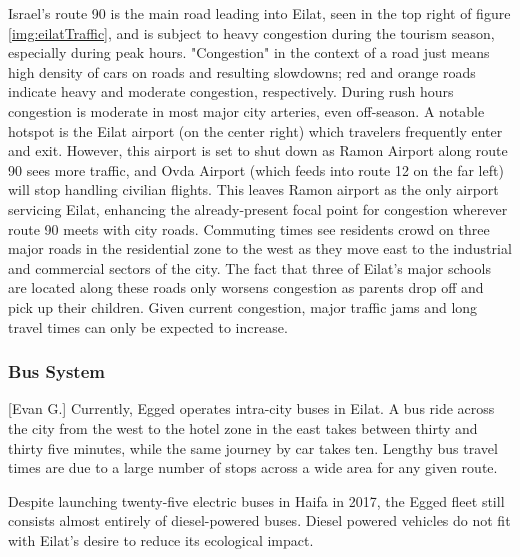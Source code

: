 \documentclass[12pt]{article}                               %
\begin{document}
Israel's route 90 is the main road leading into Eilat, seen in the top right of figure \ref{img:eilatTraffic}, and is subject to heavy congestion during the tourism season, especially during peak hours. "Congestion" in the context of a road just means high density of cars on roads and resulting slowdowns; red and orange roads indicate heavy and moderate congestion, respectively. During rush hours congestion is moderate in most major city arteries, even off-season. A notable hotspot is the Eilat airport (on the center right) which travelers frequently enter and exit. However, this airport is set to shut down as Ramon Airport along route 90 sees more traffic, and Ovda Airport (which feeds into route 12 on the far left) will stop handling civilian flights. This leaves Ramon airport as the only airport servicing Eilat, enhancing the already-present focal point for congestion wherever route 90 meets with city roads. Commuting times see residents crowd on three major roads in the residential zone to the west as they move east to the industrial and commercial sectors of the city. The fact that three of Eilat's major schools are located along these roads only worsens congestion as parents drop off and pick up their children. Given current congestion, major traffic jams and long travel times can only be expected to increase.

\subsubsection{Bus System}[Evan G.]
Currently, Egged operates intra-city buses in Eilat. A bus ride across the city from the west to the hotel zone in the east takes between thirty and thirty five minutes, while the same journey by car takes ten. Lengthy bus travel times are due to a large number of stops across a wide area for any given route. 

Despite launching twenty-five electric buses in Haifa in 2017, the Egged fleet still consists almost entirely of diesel-powered buses. Diesel powered vehicles do not fit with Eilat's desire to reduce its ecological impact.


\end{document}
